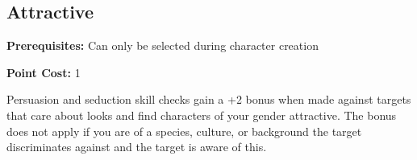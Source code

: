 \subsection{Attractive}\label{feat:attractive}

\noindent
\textbf{Prerequisites:} Can only be selected during character creation

\noindent
\textbf{Point Cost:} 1 

Persuasion and seduction skill checks gain a +2 bonus when made against
targets that care about looks and find characters of your gender attractive.
The bonus does not apply if you are of a species, culture, or background the
target discriminates against and the target is aware of this.
